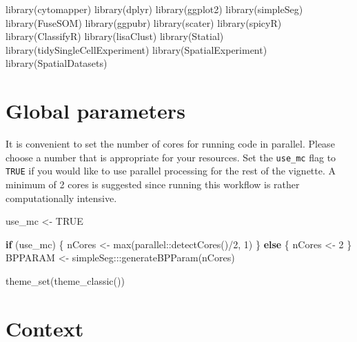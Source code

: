 \documentclass[
  letterpaper,
  DIV=11,
  numbers=noendperiod]{scrreprt}
\newenvironment{Shaded}{\begin{snugshade}}{\end{snugshade}}
\newcommand{\ConstantTok}[1]{\textcolor[rgb]{0.56,0.35,0.01}{#1}}
\newcommand{\ControlFlowTok}[1]{\textcolor[rgb]{0.00,0.23,0.31}{\textbf{#1}}}
\newcommand{\DecValTok}[1]{\textcolor[rgb]{0.68,0.00,0.00}{#1}}
\newcommand{\FunctionTok}[1]{\textcolor[rgb]{0.28,0.35,0.67}{#1}}
\newcommand{\NormalTok}[1]{\textcolor[rgb]{0.00,0.23,0.31}{#1}}
\newcommand{\OtherTok}[1]{\textcolor[rgb]{0.00,0.23,0.31}{#1}}
\newcommand{\SpecialCharTok}[1]{\textcolor[rgb]{0.37,0.37,0.37}{#1}}
\begin{document}
\begin{Shaded}
\begin{Highlighting}[]
\FunctionTok{library}\NormalTok{(cytomapper)}
\FunctionTok{library}\NormalTok{(dplyr)}
\FunctionTok{library}\NormalTok{(ggplot2)}
\FunctionTok{library}\NormalTok{(simpleSeg)}
\FunctionTok{library}\NormalTok{(FuseSOM)}
\FunctionTok{library}\NormalTok{(ggpubr)}
\FunctionTok{library}\NormalTok{(scater)}
\FunctionTok{library}\NormalTok{(spicyR)}
\FunctionTok{library}\NormalTok{(ClassifyR)}
\FunctionTok{library}\NormalTok{(lisaClust)}
\FunctionTok{library}\NormalTok{(Statial)}
\FunctionTok{library}\NormalTok{(tidySingleCellExperiment)}
\FunctionTok{library}\NormalTok{(SpatialExperiment)}
\FunctionTok{library}\NormalTok{(SpatialDatasets)}
\end{Highlighting}
\end{Shaded}

\section{Global parameters}\label{global-parameters}

It is convenient to set the number of cores for running code in
parallel. Please choose a number that is appropriate for your resources.
Set the \texttt{use\_mc} flag to \texttt{TRUE} if you would like to use
parallel processing for the rest of the vignette. A minimum of 2 cores
is suggested since running this workflow is rather computationally
intensive.

\begin{Shaded}
\begin{Highlighting}[]
\NormalTok{use\_mc }\OtherTok{\textless{}{-}} \ConstantTok{TRUE}

\ControlFlowTok{if}\NormalTok{ (use\_mc) \{}
\NormalTok{  nCores }\OtherTok{\textless{}{-}} \FunctionTok{max}\NormalTok{(parallel}\SpecialCharTok{::}\FunctionTok{detectCores}\NormalTok{()}\SpecialCharTok{/}\DecValTok{2}\NormalTok{, }\DecValTok{1}\NormalTok{)}
\NormalTok{\} }\ControlFlowTok{else}\NormalTok{ \{}
\NormalTok{  nCores }\OtherTok{\textless{}{-}} \DecValTok{2}
\NormalTok{\}}
\NormalTok{BPPARAM }\OtherTok{\textless{}{-}}\NormalTok{ simpleSeg}\SpecialCharTok{:::}\FunctionTok{generateBPParam}\NormalTok{(nCores)}

\FunctionTok{theme\_set}\NormalTok{(}\FunctionTok{theme\_classic}\NormalTok{())}
\end{Highlighting}
\end{Shaded}

\section{Context}\label{context}
\end{document}
